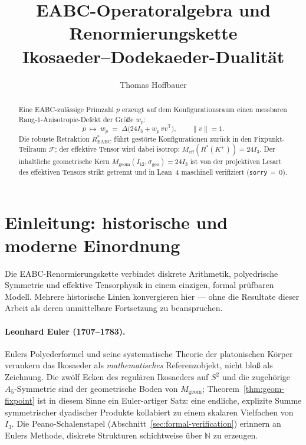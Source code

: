 \documentclass[11pt,a4paper]{article}
\title{EABC-Operatoralgebra und Renormierungskette\\[0.3em]
\large Ikosaeder--Dodekaeder-Dualität}
\author{Thomas Hoffbauer}
\date{}
\begin{document}
\maketitle

\begin{abstract}
Eine EABC-zulässige Primzahl $p$ erzeugt auf dem Konfigurationsraum einen
messbaren Rang-1-Anisotropie-Defekt der Größe $w_p$:
\[
  p \;\longmapsto\; w_p \;=\; \Delta\!\bigl(24I_3 + w_p\,vv^{\mathsf T}\bigr),
  \qquad \|v\|=1.
\]
Die robuste Retraktion $R^*_{\mathrm{EABC}}$ führt gestörte Konfigurationen
zurück in den Fixpunkt-Teilraum $\mathcal{F}$; der effektive Tensor wird dabei
isotrop: $M_{\mathrm{eff}}(R^*(K^+))=24I_3$.
Der inhaltliche geometrische Kern
$M_{\mathrm{geom}}(I_{12},\sigma_{\mathrm{geo}})=24I_3$
ist von der projektiven Lesart des effektiven Tensors strikt getrennt und in
Lean~4 maschinell verifiziert (\texttt{sorry}\,$=\,0$).
\end{abstract}

\section{Einleitung: historische und moderne Einordnung}
\label{sec:introduction}

Die EABC-Renormierungskette verbindet diskrete Arithmetik, polyedrische Symmetrie
und effektive Tensorphysik in einem einzigen, formal prüfbaren Modell.
Mehrere historische Linien konvergieren hier --- ohne die Resultate dieser Arbeit
als deren unmittelbare Fortsetzung zu beanspruchen.

\paragraph{Leonhard Euler (1707--1783).}
Eulers Polyederformel und seine systematische Theorie der platonischen Körper
verankern das Ikosaeder als \emph{mathematisches} Referenzobjekt, nicht bloß als
Zeichnung.
Die zwölf Ecken des regulären Ikosaeders auf $S^2$ und die zugehörige
$A_5$-Symmetrie sind der geometrische Boden von $M_{\mathrm{geom}}$;
Theorem~\ref{thm:geom-fixpoint} ist in diesem Sinne ein Euler-artiger Satz:
eine endliche, explizite Summe symmetrischer dyadischer Produkte kollabiert
zu einem skalaren Vielfachen von $I_3$.
Die Peano-Schalenstapel (Abschnitt~\ref{sec:formal-verification}) erinnern an
Eulers Methode, diskrete Strukturen schichtweise über $\mathbb{N}$ zu erzeugen.
\end{document}
